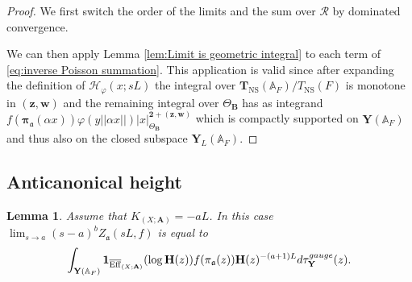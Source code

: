 \documentclass[a4paper,11pt,reqno]{amsart}
\newcommand{\A}{\mathbb{A}}
\DeclareMathOperator{\NS}{NS}
\DeclareMathOperator{\Eff}{\overline{Eff}}
\newtheorem{lemma}[theorem]{Lemma}
\theoremstyle{definition}
\begin{document}
\begin{proof}
	We first switch the order of the limits and the sum over $\mathcal{R}$ by dominated convergence.
	
	We can then apply Lemma \ref{lem:Limit is geometric integral} to each term of \eqref{eq:inverse Poisson summation}. This application is valid since after expanding the definition of $\mathcal{H}_{\varphi}(x ; sL)$ the integral over $\mathbf{T}_{\NS}(\A_F)/T_{\NS}(F)$ is monotone in $(\bm{z}, \bm{w})$ and the remaining integral over $\Theta_{\mathbf{B}}$ has as integrand $f(\bm{\pi}_{\mathfrak{a}}(\alpha x)) \varphi(y ||\alpha x||) |x|_{\Theta_{\mathbf{B}}}^{\mathbf{2} + (\bm{z}, \bm{w})}$ which is compactly supported on $\mathbf{Y}(\A_F)$ and thus also on the closed subspace $\mathbf{Y}_L(\A_F)$.
\end{proof}
\subsection{Anticanonical height}
\begin{lemma}\label{lem:residue of height zeta function:anticanonical}
	Assume that $K_{(X ; \mathbf{A})} = -aL$. In this case $\lim_{s \to a} (s - a)^bZ_{\mathfrak{a}}(s L, f)$ is equal to
	\[
	\int_{\mathbf{Y}(\A_F)} \mathbf{1}_{\Eff_{(X ; \mathbf{A})}}(\log \mathbf{H}(z)) f(\pi_{\mathfrak{a}}(z)) \mathbf{H}(z)^{-(a + 1)L} d \tau_{\mathbf{Y}}^{\emph{gauge}}(z).
	\]
\end{lemma}
\end{document}
